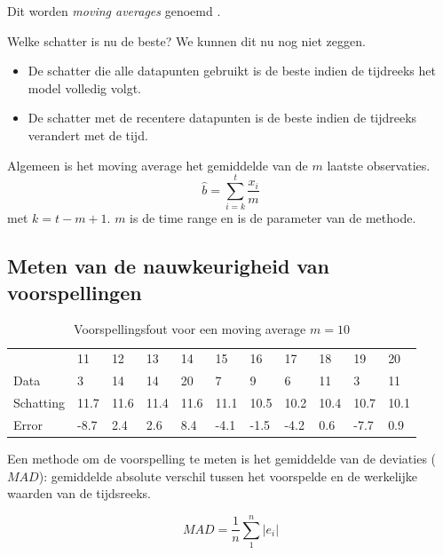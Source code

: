 Dit worden \textit{moving averages} genoemd . 

Welke schatter is nu de beste? We kunnen dit nu nog niet zeggen. 
\begin{itemize}
	\item De schatter die alle datapunten gebruikt is de beste indien de tijdreeks het model volledig volgt.
	\item De schatter met de recentere datapunten is de beste indien de tijdreeks verandert met de tijd.
\end{itemize}

\begin{definition}
	Algemeen is het moving average het gemiddelde van de $m$ laatste observaties.
	\begin{equation}
		\widehat{b} = \sum_{i=k}^{t} \frac{x_{i}}{m}
	\label{eq:movingAverage}
	\end{equation}
	met $k = t-m+1$. $m$ is de time range en is de parameter van de methode.
\end{definition}

\pagebreak
\subsection{Meten van de nauwkeurigheid van voorspellingen}

\begin{table}
	\begin{tabular}{|lllllllllll|}
		\hline
		~         & 11   & 12   & 13   & 14   & 15   & 16   & 17   & 18   & 19   & 20   \\
		Data      & 3    & 14   & 14   & 20   & 7    & 9    & 6    & 11   & 3    & 11   \\
		Schatting & 11.7 & 11.6 & 11.4 & 11.6 & 11.1 & 10.5 & 10.2 & 10.4 & 10.7 & 10.1 \\
		Error     & -8.7 & 2.4  & 2.6  & 8.4  & -4.1 & -1.5 & -4.2 & 0.6  & -7.7 & 0.9  \\ \hline
	\end{tabular}
	\caption{Voorspellingsfout voor een moving average $m = 10$}
	\label{tab:error}
\end{table}


Een methode om de voorspelling te meten is het gemiddelde van de deviaties ($MAD$): gemiddelde absolute verschil tussen het voorspelde en de werkelijke waarden van de tijdsreeks.

\begin{definition}[$MAD$]
\begin{equation}
	MAD = \frac{1}{n} \sum_{1}^{n} \left| e_{i} \right|  
\label{eq:MAD}
\end{equation}
\end{definition}

